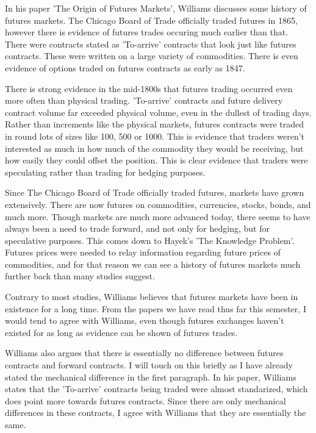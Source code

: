 \documentclass[11pt]{article}
\begin{document}
In his paper 'The Origin of Futures Markets', Williams discusses some
history of futures markets. The Chicago Board of Trade officially traded
futures in 1865, however there is evidence of futures trades occuring
much earlier than that. There were contracts stated as 'To-arrive'
contracts that look just like futures contracts. These were written on a
large variety of commodities. There is even evidence of options traded
on futures contracts as early as 1847.

There is strong evidence in the mid-1800s that futures trading occurred
even more often than physical trading. 'To-arrive' contracts and future
delivery contract volume far exceeded physical volume, even in the
dullest of trading days. Rather than increments like the physical
markets, futures contracts were traded in round lots of sizes like 100,
500 or 1000. This is evidence that traders weren't interested as much in
how much of the commodity they would be receiving, but how easily they
could offset the position. This is clear evidence that traders were
speculating rather than trading for hedging purposes.

Since The Chicago Board of Trade officially traded futures, markets have
grown extensively. There are now futures on commodities, currencies,
stocks, bonds, and much more. Though markets are much more advanced
today, there seems to have always been a need to trade forward, and not
only for hedging, but for speculative purposes. This comes down to
Hayek's 'The Knowledge Problem'. Futures prices were needed to relay
information regarding future prices of commodities, and for that reason
we can see a history of futures markets much further back than many
studies suggest.

Contrary to most studies, Williams believes that futures markets have
been in existence for a long time. From the papers we have read thus far
this semester, I would tend to agree with Williams, even though futures
exchanges haven't existed for as long as evidence can be shown of
futures trades.

Williams also argues that there is essentially no difference between
futures contracts and forward contracts. I will touch on this briefly as
I have already stated the mechanical difference in the first paragraph.
In his paper, Williams states that the 'To-arrive' contracts being
traded were almost standarized, which does point more towards futures
contracts. Since there are only mechanical differences in these
contracts, I agree with Williams that they are essentially the same.
\end{document}
